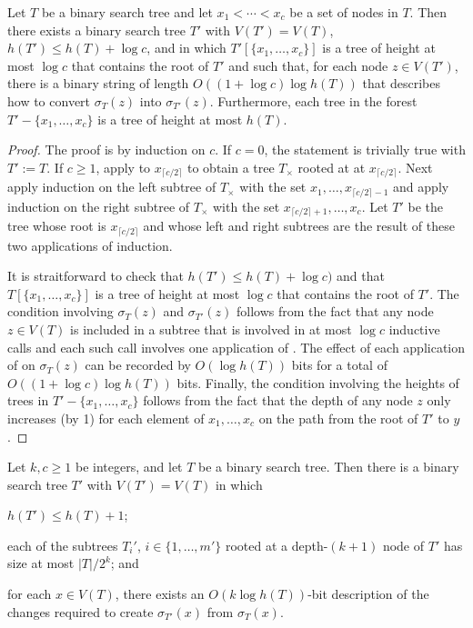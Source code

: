 \documentclass[kpfonts]{patmorin}
\begin{document}
\begin{lem}
  Let $T$ be a binary search tree and let $x_1<\cdots<x_c$ be a set of nodes in $T$. Then there exists a binary search tree $T'$ with $V(T')=V(T)$, $h(T')\le h(T)+\log c$, and in which $T'[\{x_1,\ldots,x_c\}]$ is a tree of height at most $\log c$ that contains the root of $T'$ and such that, for each node $z\in V(T')$, there is a binary string of length $O((1+\log c)\log h(T))$ that describes how to convert $\sigma_T(z)$ into $\sigma_{T'}(z)$.  Furthermore, each tree in the forest $T'-\{x_1,\ldots,x_c\}$ is a tree of height at most $h(T)$.
\end{lem}

\begin{proof}
  The proof is by induction on $c$.  If $c=0$, the statement is trivially true with $T':=T$.  If $c\ge 1$,  apply  to $x_{\lceil c/2\rceil}$ to obtain a tree $T_\times$ rooted at at $x_{\lceil c/2\rceil}$.  Next apply induction on the left subtree of $T_\times$ with the set $x_1,\ldots,x_{\lceil c/2\rceil -1}$ and apply induction on the right subtree of $T_\times$ with the set $x_{\lceil c/2\rceil +1},\ldots,x_c$.  Let $T'$ be the tree whose root is $x_{\lceil c/2\rceil}$ and whose left and right subtrees are the result of these two applications of induction.
  
  It is straitforward to check that $h(T')\le h(T)+\log c)$ and that $T[\{x_1,\ldots,x_c\}]$ is a tree of height at most $\log c$ that contains the root of $T'$.  The condition involving $\sigma_T(z)$ and $\sigma_{T'}(z)$ follows from the fact that any node $z\in V(T)$ is included in a subtree that is involved in at most $\log c$ inductive calls and each such call involves one application of .  The effect of each application of  on $\sigma_T(z)$ can be recorded by $O(\log h(T))$ bits for a total of $O((1+\log c)\log h(T))$ bits.  Finally, the condition involving the heights of trees in $T'-\{x_1,\ldots,x_c\}$ follows from the fact that the depth of any node $z$ only increases (by 1) for each element of $x_1,\ldots,x_c$ on the path from the root of $T'$ to $y$.
\end{proof}

\begin{lem}
  Let $k,c\ge 1$ be integers, and let $T$ be a binary search tree.  Then there is a binary search tree $T'$ with $V(T')=V(T)$ in which
  \begin{compactenum}
    \item $h(T')\le h(T)+1$; 

    \item  each of the subtrees $T_i'$, $i\in\{1,\ldots,m'\}$ rooted at a depth-$(k+1)$ node of $T'$ has size at most $|T|/2^k$; and
    
    \item for each $x\in V(T)$, there exists an $O(k\log h(T))$-bit description of the changes required to create $\sigma_{T'}(x)$ from $\sigma_T(x)$.
  \end{compactenum}
\end{lem}
\end{document}
